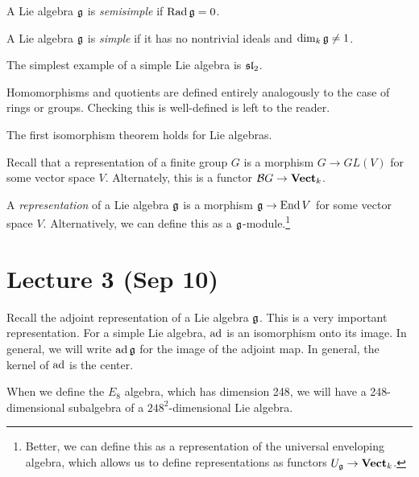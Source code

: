 \documentclass[twoside, 10pt]{article}
\begin{document}
    \begin{defn} A Lie algebra $\mathfrak{g}$ is \textit{semisimple} if
    $\operatorname{Rad} \mathfrak{g} = 0$.  \end{defn}

    \begin{defn} A Lie algebra $\mathfrak{g}$ is \textit{simple} if it has no
    nontrivial ideals and $\dim_k \mathfrak{g} \neq 1$.  \end{defn}

    \begin{exm} The simplest example of a simple Lie algebra is $\mathfrak{sl}_2$.
    \end{exm}

    Homomorphisms and quotients are defined entirely analogously to the case of
    rings or groups. Checking this is well-defined is left to the reader.

    \begin{rmk} The first isomorphism theorem holds for Lie algebras.
    \end{rmk}

    Recall that a representation of a finite group $G$ is a morphism $G \to
    GL(V)$ for some vector space $V$. Alternately, this is a functor $\mathcal{B}G
    \to \mathbf{Vect}_k$.

    \begin{defn} A \textit{representation} of a Lie algebra $\mathfrak{g}$ is a
        morphism $\mathfrak{g} \to \operatorname{End}{V}$ for some vector space $V$. Alternatively,
        we can define this as a $\mathfrak{g}$-module.\footnote{Better, we can define
        this as a representation of the universal enveloping algebra, which
    allows us to define representations as functors $U_{\mathfrak{g}} \to
\mathbf{Vect}_k$.} \end{defn}

    \section{Lecture 3 (Sep 10)}%

    Recall the adjoint representation of a Lie algebra $\mathfrak{g}$. This is a very
    important representation. For a simple Lie algebra, $\operatorname{ad}$ is an isomorphism
    onto its image. In general, we will write $\operatorname{ad} \mathfrak{g}$ for the image of the
    adjoint map. In general, the kernel of $\operatorname{ad}$ is the center. 

    \begin{rmk} When we define the $E_8$ algebra, which has dimension 248, we
    will have a 248-dimensional subalgebra of a $248^2$-dimensional Lie
algebra.  \end{rmk}
\end{document}
